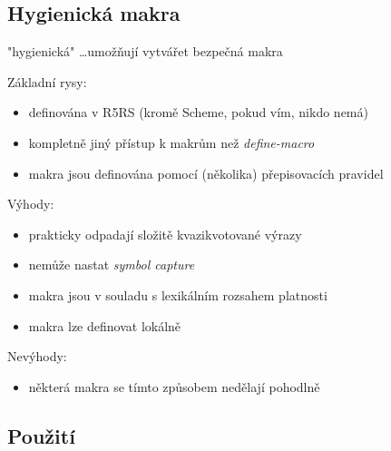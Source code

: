 \documentclass[10pt,a4paper]{article}
\begin{document}
\subsection{Hygienická makra}
\begin{center}
	"hygienická" \dots umožňují vytvářet bezpečná makra
\end{center}
Základní rysy:
\begin{itemize}
	\item definována v R5RS (kromě Scheme, pokud vím, nikdo nemá)
	\item kompletně jiný přístup k makrům než \textit{define-macro}
	\item makra jsou definována pomocí (několika) přepisovacích pravidel
\end{itemize}
Výhody:
\begin{itemize}
	\item prakticky odpadají složitě kvazikvotované výrazy
	\item nemůže nastat \textit{symbol capture}
	\item makra jsou v souladu s lexikálním rozsahem platnosti
	\item makra lze definovat lokálně
\end{itemize}
Nevýhody:
\begin{itemize}
	\item některá makra se tímto způsobem nedělají pohodlně
\end{itemize}

\subsection{Použití}
\end{document}
